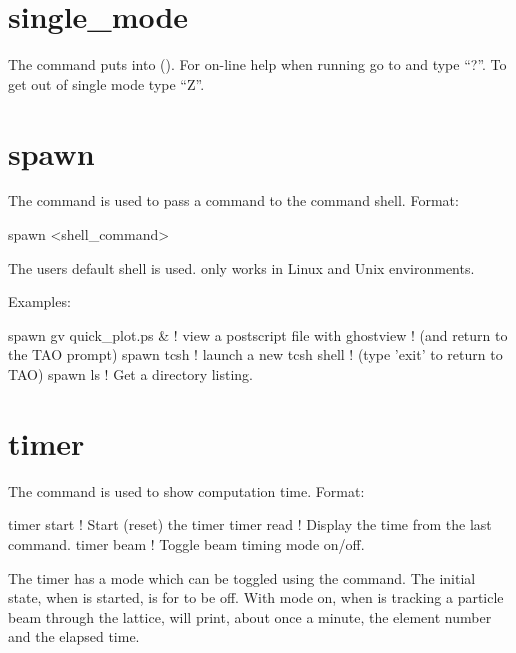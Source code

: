 {{{{{{\section{single_mode}
\label{s:sing}

The  command puts \tao into  ().
For on-line help when running \tao go to  and type ``?''.
To get out of single mode type ``Z''.

\section{spawn}
\label{s:spawn}

The  command is used to pass a command to the command shell. Format:
\begin{example}
  spawn <shell_command>
\end{example}

The users default shell is used.  only works in Linux and Unix environments.

Examples:
\begin{example}
  spawn gv quick_plot.ps &      ! view a postscript file with ghostview
                                ! (and return to the TAO prompt)
  spawn tcsh                    ! launch a new tcsh shell 
                                ! (type 'exit' to return to TAO)
  spawn ls                      ! Get a directory listing.
\end{example}

\section{timer}
\label{s:timer}

The  command is used to show computation time. Format:
\begin{example}
  timer start      ! Start (reset) the timer
  timer read       ! Display the time from the last  command.    
  timer beam       ! Toggle beam timing mode on/off.
\end{example}
The timer has a  mode which can be toggled using the 
command. The initial state, when \tao is started, is for  to be off. With
 mode on, when \tao is tracking a particle beam through the lattice, \tao
will print, about once a minute, the element number and the elapsed time.

}}}}}}
